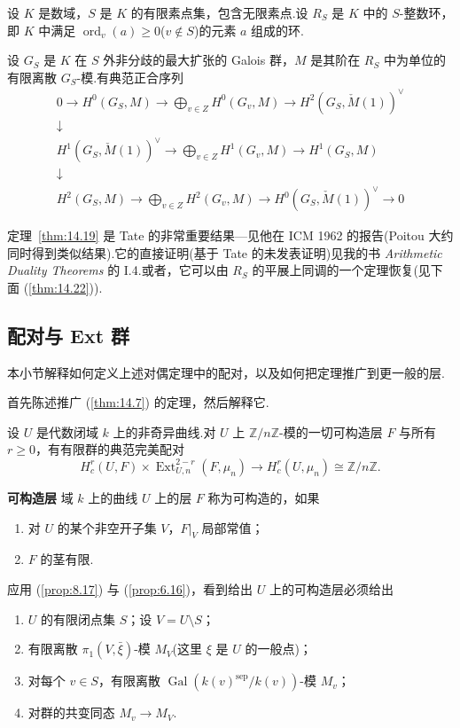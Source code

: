 设 $K$ 是数域，$S$ 是 $K$ 的有限素点集，包含无限素点.设 $R_S$ 是 $K$ 中的 $S$-整数环，即 $K$ 中满足 $\operatorname{ord}_v(a) \geq 0$($v \notin S$)的元素 $a$ 组成的环.

\begin{theorem}\label{thm:14.19}
设 $G_S$ 是 $K$ 在 $S$ 外非分歧的最大扩张的 Galois 群，$M$ 是其阶在 $R_S$ 中为单位的有限离散 $G_S$-模.有典范正合序列
\[
\begin{array}{c}
0 \to H^{0}(G_S, M) \to \displaystyle\bigoplus_{v \in Z} H^{0}(G_v, M) \to H^{2}(G_S, \check{M}(1))^{\vee} \\
\downarrow \\
H^{1}(G_S, \check{M}(1))^{\vee} \to \displaystyle\bigoplus_{v \in Z} H^{1}(G_v, M) \to H^{1}(G_S, M) \\
\downarrow \\
H^{2}(G_S, M) \to \displaystyle\bigoplus_{v \in Z} H^{2}(G_v, M) \to H^{0}(G_S, \check{M}(1))^{\vee} \to 0
\end{array}
\]
\end{theorem}

定理~\ref{thm:14.19} 是 Tate 的非常重要结果---见他在 ICM 1962 的报告(Poitou 大约同时得到类似结果).它的直接证明(基于 Tate 的未发表证明)见我的书 \emph{Arithmetic Duality Theorems} 的 I.4.或者，它可以由 $R_S$ 的平展上同调的一个定理恢复(见下面 (\ref{thm:14.22})).

\subsection*{配对与 Ext 群}

本小节解释如何定义上述对偶定理中的配对，以及如何把定理推广到更一般的层.

首先陈述推广 (\ref{thm:14.7}) 的定理，然后解释它.

\begin{theorem}\label{thm:14.20}
设 $U$ 是代数闭域 $k$ 上的非奇异曲线.对 $U$ 上 $\mathbb{Z}/n\mathbb{Z}$-模的一切可构造层 $F$ 与所有 $r \geq 0$，有有限群的典范完美配对
\[
H^{r}_{c}(U, F) \times \operatorname{Ext}^{2-r}_{U, n}(F, \mu_n) \to H^{r}_{c}(U, \mu_n) \cong \mathbb{Z}/n\mathbb{Z}.
\]
\end{theorem}

\textbf{可构造层} 域 $k$ 上的曲线 $U$ 上的层 $F$ 称为可构造的，如果
\begin{enumerate}
  \item 对 $U$ 的某个非空开子集 $V$，$F|_{V}$ 局部常值；
  \item $F$ 的茎有限.
\end{enumerate}
应用 (\ref{prop:8.17}) 与 (\ref{prop:6.16})，看到给出 $U$ 上的可构造层必须给出
\begin{enumerate}
  \item $U$ 的有限闭点集 $S$；设 $V = U \setminus S$；
  \item 有限离散 $\pi_1(V, \bar{\xi})$-模 $M_V$(这里 $\xi$ 是 $U$ 的一般点)；
  \item 对每个 $v \in S$，有限离散 $\operatorname{Gal}(k(v)^{\mathrm{sep}}/k(v))$-模 $M_v$；
  \item 对群的共变同态 $M_v \to M_V$.
\end{enumerate}

